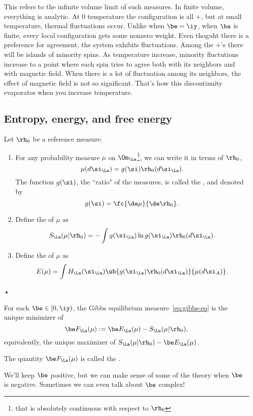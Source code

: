 This refers to the infinite volume limit of such measures. In finite volume, everything is analytic. 
At 0 temperature the configuration is all $+$, but at small temperature, thermal fluctuations occur. Unlike when $\be=\iy$, when $\be$ is finite, every local configuration gets some nonzero weight. Even thoguht there is a preference for agreement, the system exhibits fluctuations. Among the $+$'s there will be islands of minority spins. As temperature increase, minority fluctutions increase to a point where each spin tries to agree both with its neighbors and with magnetic field. When there is a lot of fluctuation among its neighbors, the effect of magnetic field is not so significant. That's how this discontinuity evaporates when you increase temperature.

\subsection{Entropy, energy, and free energy}
\begin{df}
Let $\rh_0$ be a reference measure.
\begin{enumerate}
\item
For any probability measure $\mu$ on $\Om_{\La}$\footnote{that is absolutely continuous with respect to $\rh_0$}, we can write it in terms of $\rh_0$,
\[
\mu(d\si_\La) = g(\si) \rh_0(d\si_\La).
\]
The function $g(\si)$, the ``ratio" of the measures, is called the , and denoted by
\[
g(\si) = \fc{\de\mu}{\de\rh_0}.
\]
\item
Define the  of $\mu$ as
\[
S_\La(\mu|\rh_0) = -\int g(\si_\La)\ln g(\si_\La) \rh_0(d\si_\La).
\]
\item Define the  of $\mu$ as 
\[
E(\mu) = \int H_{\La}(\si_{\La}) \ub{g(\si_{\La})\rh_0 (d\si_\La)}{\mu(d\si_A)}.
\]

\end{enumerate}•
\end{df}
\begin{thm}
For each $\be\in [0,\iy)$, the Gibbs equilibrium measure~\eqref{eq:gibbs-eq} is the unique minimizer of 
\[
\be F_\La(\mu) := \be E_{\La}(\mu) - S_\La(\mu|\rh_0),
\]
equivalently, the unique maximizer of $S_{\La}(\mu|\rh_0) - \be E_{\La}(\mu)$.
\end{thm}
\begin{df}
The quantity $\be F_{\La}(\mu)$ is called the .
\end{df}
We'll keep $\be$ positive, but we can make sense of some of the theory when $\be$ is negative. Sometimes we can even talk about $\be$ complex!

